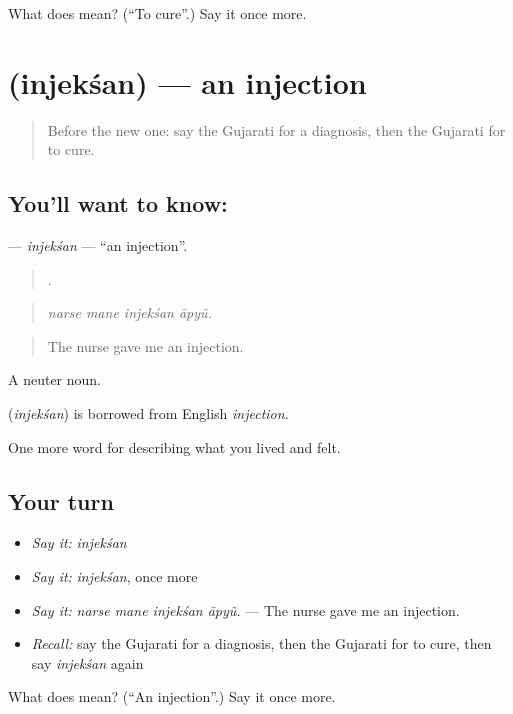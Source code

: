 \begin{tcolorbox}[breakable,colback=teal!4,colframe=teal!35!black,title={Before you move on}]
What does  mean? (\textquotedblleft{}To cure\textquotedblright{}.) Say it once more.
\end{tcolorbox}
\section[\texorpdfstring{\gu{ઇન્જેક્શન} (injekśan)}{ઇન્જેક્શન (injekśan)}]{ (injekśan) — an injection}

\label{lesson:GU-C484-injeksan}



\begin{quote}
Before the new one: say the Gujarati for a diagnosis, then the Gujarati for to cure.
\end{quote}

\subsection*{You'll want to know: }
\textbf{} — \emph{injekśan} — \textquotedblleft{}an injection\textquotedblright{}.

\begin{quote}
   .
\end{quote}

\begin{quote}
\emph{narse mane injekśan āpyũ.}
\end{quote}

\begin{quote}
The nurse gave me an injection.
\end{quote}

A neuter noun.

\begin{cousinweb}
\textbf{} (\emph{injekśan}) is borrowed from English \emph{injection}.
\end{cousinweb}

\begin{grammarlens}[title={What you've built}]
One more word for describing what you lived and felt.
\end{grammarlens}

\subsection*{Your turn}
\begin{itemize}
\raggedright
  \item \emph{Say it:} \emph{injekśan}
  \item \emph{Say it:} \emph{injekśan}, once more
  \item \emph{Say it:} \emph{narse mane injekśan āpyũ.} — The nurse gave me an injection.
  \item \emph{Recall:} say the Gujarati for a diagnosis, then the Gujarati for to cure, then say \emph{injekśan} again
\end{itemize}

\begin{tcolorbox}[breakable,colback=teal!4,colframe=teal!35!black,title={Before you move on}]
What does  mean? (\textquotedblleft{}An injection\textquotedblright{}.) Say it once more.
\end{tcolorbox}

